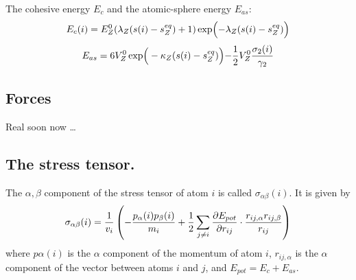 \documentclass[a4paper,12pt]{article}
\begin{document}
The cohesive energy $E_c$ and the atomic-sphere energy $E_{as}$:
\begin{equation}
  \label{Ec}
  E_c(i) = E^0_Z (\lambda_Z (s(i) - s^{eq}_Z) + 1)
  \exp \Bigl(-\lambda_Z (s(i) - s^{eq}_Z) \Bigl)
\end{equation}
\begin{equation}
  \label{Eas}
  E_{as} = 6 V^0_Z \exp \Bigr(-\kappa_Z (s(i) - s^{eq}_Z) \Bigl) -
  {1 \over 2} V^0_Z {\sigma_2(i) \over \gamma_2}
\end{equation}


\subsection*{Forces}
Real soon now \ldots


\subsection*{The stress tensor.}

The $\alpha,\beta$ component of the stress tensor of atom $i$ is
called $\sigma_{\alpha\beta}(i)$.  It is given by
\begin{equation}
  \label{stress}
  \sigma_{\alpha\beta}(i) = {1 \over v_i} \left( - {p_\alpha(i)
    p_\beta(i) \over m_i} + {1 \over 2} \sum_{j \neq i} {\partial
    E_{pot} \over \partial r_{ij}} \cdot {r_{ij,\alpha} r_{ij,\beta}
    \over r_{ij}} \right)
\end{equation}
where $p\alpha(i)$ is the $\alpha$ component of the momentum of atom
$i$, $r_{ij,\alpha}$ is the $\alpha$ component of the vector between
atoms $i$ and $j$, and $E_{pot} = E_c + E_{as}$.
\end{document}
